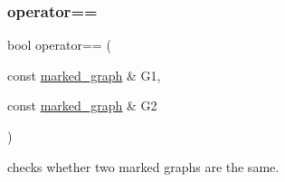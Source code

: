 \mbox{\label{classmarked__graph_a1718b82e881f8c37552018df1f83f82c}} 
\subsubsection{\texorpdfstring{operator==}{operator==}}
{\footnotesize\ttfamily bool operator== (\begin{DoxyParamCaption}\item[{const \hyperlink{classmarked__graph}{marked\+\_\+graph} \&}]{G1,  }\item[{const \hyperlink{classmarked__graph}{marked\+\_\+graph} \&}]{G2 }\end{DoxyParamCaption})\hspace{0.3cm}{\ttfamily [friend]}}



checks whether two marked graphs are the same. 

